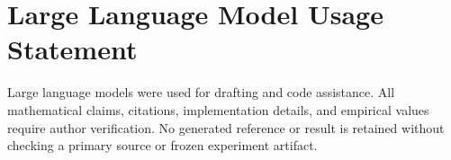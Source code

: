 \documentclass{article}
\theoremstyle{definition}
\theoremstyle{remark}
\begin{document}
\section{Large Language Model Usage Statement}

Large language models were used for drafting and code assistance. All mathematical claims, citations, implementation details, and empirical values require author verification. No generated reference or result is retained without checking a primary source or frozen experiment artifact.
\end{document}
